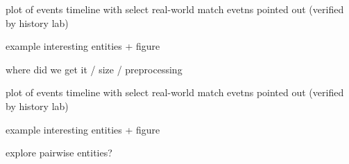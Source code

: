\PP plot of events timeline with select real-world match evetns pointed out (verified by history lab)

\PP example interesting entities + figure

\PP where did we get it / size / preprocessing

\PP plot of events timeline with select real-world match evetns pointed out (verified by history lab)

\PP example interesting entities + figure

\PP explore pairwise entities?













